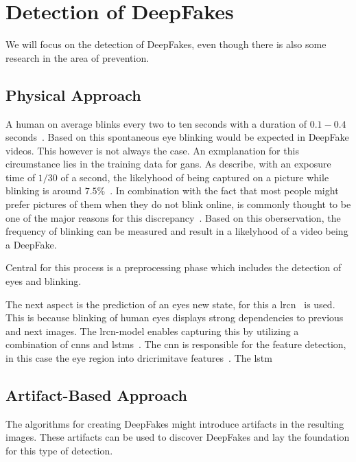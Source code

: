\section{Detection of DeepFakes}
We will focus on the detection of DeepFakes, even though there is also some research in the area of
prevention.

\subsection{Physical Approach}
A human on average blinks every two to ten seconds with a duration of \(0.1-0.4\) seconds~\cite{li_ictu_2018}.
Based on this spontaneous eye blinking would be expected in DeepFake videos.
This however is not always the case.
An exmplanation for this circumstance lies in the training data for \glspl{gan}.
As \textcite{li_ictu_2018} describe, with an exposure time of \(1/30\) of a second,
the likelyhood of being captured on a picture while blinking is around \(7.5\%\)~\cite{li_ictu_2018}.
In combination with the fact that most people might prefer pictures of them when they do not blink online,
is commonly thought to be one of the major reasons for this discrepancy~\cite{pishori_detecting_2020}.
Based on this oberservation, the frequency of blinking can be measured and result in a likelyhood of
a video being a DeepFake.

Central for this process is a preprocessing phase which includes the detection of eyes and blinking.

The next aspect is the prediction of an eyes new state, for this a \gls{lrcn}~\cite{donahue_long-term_2014} is used.
This is because blinking of human eyes displays strong dependencies to previous and next images.
The \gls{lrcn}-model enables capturing this by utilizing a combination of \glspl{cnn} and \glspl{lstm}~\cite{donahue_long-term_2014}.
The \gls{cnn} is responsible for the feature detection, in this case the eye region into dricrimitave features~\cite{li_ictu_2018,donahue_long-term_2014}.
The \gls{lstm} 


\subsection{Artifact-Based Approach}
The algorithms for creating DeepFakes might introduce artifacts in the resulting images.
These artifacts can be used to discover DeepFakes and lay the foundation for this type of detection.

